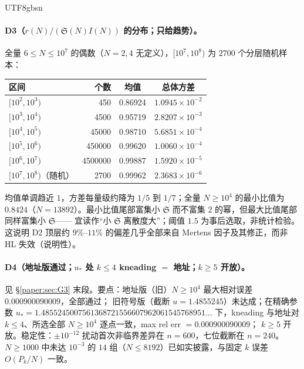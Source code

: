 \documentclass[11pt,a4paper]{article}
\newcommand{\Sing}{\mathfrak S}
\newcommand{\ust}{u_{*}}               %
\theoremstyle{plain}
\theoremstyle{definition}
\begin{document}
\begin{CJK}{UTF8}{gbsn}
\paragraph{D3（$r(N)/(\Sing(N)I(N))$ 的分布；只给趋势）。} 全量 $6\le N\le10^7$ 的偶数（$N=2,4$ 无定义），$[10^7,10^8)$ 为 $2700$ 个分层随机样本：
\begin{center}
\small
\begin{tabular}{lrcc}
\hline
区间 & 个数 & 均值 & 总体方差\\
\hline
$[10^2,10^3)$ & 450 & 0.86924 & $1.0945\times10^{-2}$\\
$[10^3,10^4)$ & 4500 & 0.95719 & $2.8207\times10^{-3}$\\
$[10^4,10^5)$ & 45000 & 0.98710 & $5.6851\times10^{-4}$\\
$[10^5,10^6)$ & 450000 & 0.99620 & $1.0060\times10^{-4}$\\
$[10^6,10^7)$ & 4500000 & 0.99887 & $1.5920\times10^{-5}$\\
$[10^7,10^8)$（随机） & 2700 & 0.99962 & $2.3683\times10^{-6}$\\
\hline
\end{tabular}
\end{center}
均值单调趋近 $1$，方差每量级约降为 $1/5$ 到 $1/7$；全量 $N\ge10^4$ 的最小比值为 $0.8424$（$N=13892$）。最小比值尾部富集小 $\Sing$ 而不富集 $2$ 的幂，但最大比值尾部同样富集小 $\Sing$——
宜读作“小 $\Sing$ 离散度大”；阈值 $1.5$ 为事后选取，非统计检验。这说明 D2 顶层约 $9\%$--$11\%$ 的偏差几乎全部来自 Mertens 因子及其修正，而非 HL 失效（说明性）。

\paragraph{D4（地址版通过；$\ust$ 处 $k\le4$ kneading $=$ 地址；$k\ge5$ 开放）。} 见 \S\ref{paper:sec:G3} 末段。要点：地址版（旧）$N\ge10^4$ 最大相对误差 $0.000900090009$，全部通过；
旧符号版（截断 $u=1.4855245$）未达成；在精确参数 $\ust=1.4855245007561368721556607962061545768951\ldots$ 下，kneading 与地址对 $k\le4$、所选全部 $N\ge10^4$ 逐点一致，max rel err $=0.000900090009$；
$k\ge5$ 开放。稳定性：$\pm10^{-12}$ 扰动首次非临界差异在 $n=600$，七位截断在 $n=240$。$N\ge1000$ 中未达 $10^{-3}$ 的 $14$ 组（$N\le8192$）已如实披露，与固定 $k$ 误差 $O(P_k/N)$ 一致。


\end{CJK}
\end{document}

